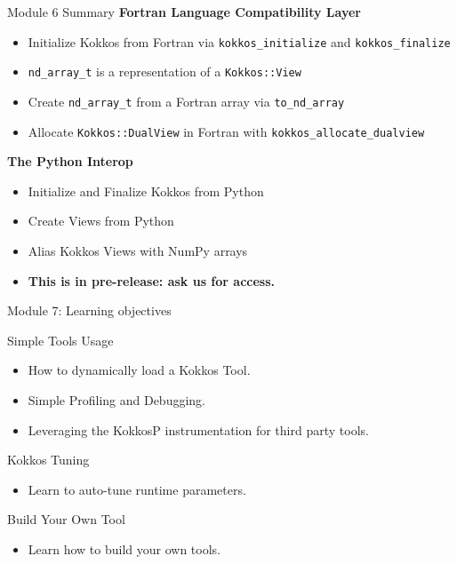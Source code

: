 \begin{frame}[fragile]{Module 6 Summary}
\textbf{Fortran Language Compatibility Layer}
\begin{itemize}
  \item Initialize Kokkos from Fortran via \texttt{kokkos\_initialize} and \texttt{kokkos\_finalize}
  \item \texttt{nd\_array\_t} is a representation of a \texttt{Kokkos::View}
  \item Create \texttt{nd\_array\_t} from a Fortran array via \texttt{to\_nd\_array}
  \item Allocate \texttt{Kokkos::DualView} in Fortran with \texttt{kokkos\_allocate\_dualview}
\end{itemize}


  \vspace{10pt}
  \textbf{The Python Interop}
  \begin{itemize}
    \item Initialize and Finalize Kokkos from Python
    \item Create Views from Python
    \item Alias Kokkos Views with NumPy arrays
    \item \textbf{This is in pre-release: ask us for access.}
  \end{itemize}
\end{frame}

\begin{frame}{Module 7: Learning objectives}
  \begin{block}{Simple Tools Usage}
    \begin{itemize}
    \item How to dynamically load a Kokkos Tool.
    \item Simple Profiling and Debugging.
    \item Leveraging the KokkosP instrumentation for third party tools.
  \end{itemize}
  \end{block}

  \begin{block}{Kokkos Tuning}
  \begin{itemize}
    \item Learn to auto-tune runtime parameters.
  \end{itemize}
  \end{block}

  \begin{block}{Build Your Own Tool}
  \begin{itemize}
    \item Learn how to build your own tools.
  \end{itemize}
  \end{block}
\end{frame}

